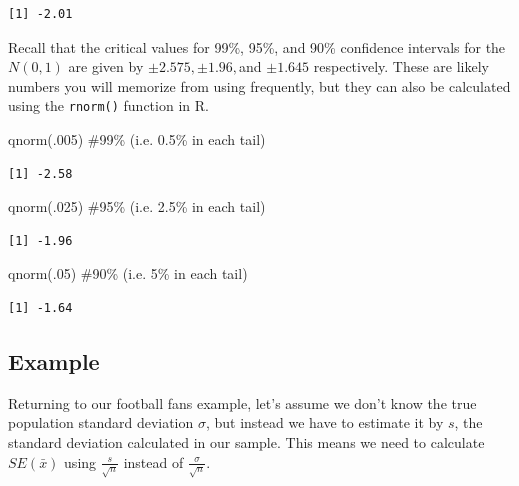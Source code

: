 \documentclass[
  letterpaper,
  DIV=11,
  numbers=noendperiod]{scrreprt}
\newenvironment{Shaded}{\begin{snugshade}}{\end{snugshade}}
\newcommand{\CommentTok}[1]{\textcolor[rgb]{0.37,0.37,0.37}{#1}}
\newcommand{\DecValTok}[1]{\textcolor[rgb]{0.68,0.00,0.00}{#1}}
\newcommand{\FunctionTok}[1]{\textcolor[rgb]{0.28,0.35,0.67}{#1}}
\newcommand{\NormalTok}[1]{\textcolor[rgb]{0.00,0.23,0.31}{#1}}
\theoremstyle{definition}
\theoremstyle{remark}
\begin{document}
\begin{verbatim}
[1] -2.01
\end{verbatim}

Recall that the critical values for 99\%, 95\%, and 90\% confidence
intervals for the \(N(0,1)\) are given by \(\pm 2.575, \pm 1.96,\)and
\(\pm 1.645\) respectively. These are likely numbers you will memorize
from using frequently, but they can also be calculated using the
\texttt{rnorm()} function in R.

\begin{Shaded}
\begin{Highlighting}[]
\FunctionTok{qnorm}\NormalTok{(.}\DecValTok{005}\NormalTok{) }\CommentTok{\#99\% (i.e. 0.5\% in each tail)}
\end{Highlighting}
\end{Shaded}

\begin{verbatim}
[1] -2.58
\end{verbatim}

\begin{Shaded}
\begin{Highlighting}[]
\FunctionTok{qnorm}\NormalTok{(.}\DecValTok{025}\NormalTok{) }\CommentTok{\#95\% (i.e. 2.5\% in each tail)}
\end{Highlighting}
\end{Shaded}

\begin{verbatim}
[1] -1.96
\end{verbatim}

\begin{Shaded}
\begin{Highlighting}[]
\FunctionTok{qnorm}\NormalTok{(.}\DecValTok{05}\NormalTok{) }\CommentTok{\#90\% (i.e. 5\% in each tail)}
\end{Highlighting}
\end{Shaded}

\begin{verbatim}
[1] -1.64
\end{verbatim}

\hypertarget{example}{%
\subsection{Example}\label{example}}

Returning to our football fans example, let's assume we don't know the
true population standard deviation \(\sigma\), but instead we have to
estimate it by \(s\), the standard deviation calculated in our sample.
This means we need to calculate \(SE(\bar{x})\) using
\(\frac{s}{\sqrt{n}}\) instead of \(\frac{\sigma}{\sqrt{n}}\).
\end{document}
